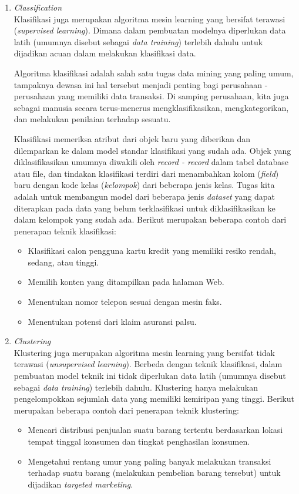 \begin{enumerate}
	\item{\textit{Classification}\cite{book:339389}}\\
	Klasifikasi juga merupakan algoritma mesin learning yang bersifat terawasi (\textit{supervised learning}). Dimana dalam pembuatan modelnya diperlukan data latih (umumnya disebut sebagai \textit{data training}) terlebih dahulu untuk dijadikan acuan dalam melakukan klasifikasi data.
	
	Algoritma klasifikasi adalah salah satu tugas data mining yang paling umum, tampaknya dewasa ini hal tersebut menjadi penting bagi perusahaan - perusahaan yang memiliki data transaksi. Di samping perusahaan, kita juga sebagai manusia secara terus-menerus mengklasifikasikan, mengkategorikan, dan melakukan penilaian terhadap sesuatu. 
	
	Klasifikasi memeriksa atribut dari objek baru yang diberikan dan dilemparkan ke dalam model standar klasifikasi yang sudah ada. Objek yang diklasifikasikan umumnya diwakili oleh \textit{record - record} dalam tabel database atau file, dan tindakan klasifikasi terdiri dari menambahkan kolom (\textit{field}) baru dengan kode kelas (\textit{kelompok}) dari beberapa jenis kelas. Tugas kita adalah untuk membangun model dari beberapa jenis \textit{dataset} yang dapat diterapkan pada data yang belum terklasifikasi untuk diklasifikasikan ke dalam kelompok yang sudah ada. Berikut merupakan beberapa contoh dari penerapan teknik klasifikasi:
\begin{itemize}
	\item Klasifikasi calon pengguna kartu kredit yang memiliki resiko rendah, sedang, atau tinggi.
	\item Memilih konten yang ditampilkan pada halaman Web.
	\item Menentukan nomor telepon sesuai dengan mesin faks.
	\item Menentukan potensi dari klaim asuransi palsu.
\end{itemize}
	\item{\textit{Clustering}\cite{book:339389}} \\
	Klustering juga merupakan algoritma mesin learning yang bersifat tidak terawasi (\textit{unsupervised learning}). Berbeda dengan teknik klasifikasi, dalam pembuatan model teknik ini tidak diperlukan data latih (umumnya disebut sebagai \textit{data training}) terlebih dahulu. Klustering hanya melakukan pengelompokkan sejumlah data yang memiliki kemiripan yang tinggi. Berikut merupakan beberapa contoh dari penerapan teknik klustering:
\begin{itemize}
	\item Mencari distribusi penjualan suatu barang tertentu berdasarkan lokasi tempat tinggal konsumen dan tingkat penghasilan konsumen.
	\item Mengetahui rentang umur yang paling banyak melakukan transaksi terhadap suatu barang (melakukan pembelian barang tersebut) untuk dijadikan \textit{targeted marketing}.
\end{itemize}
\end{enumerate}

